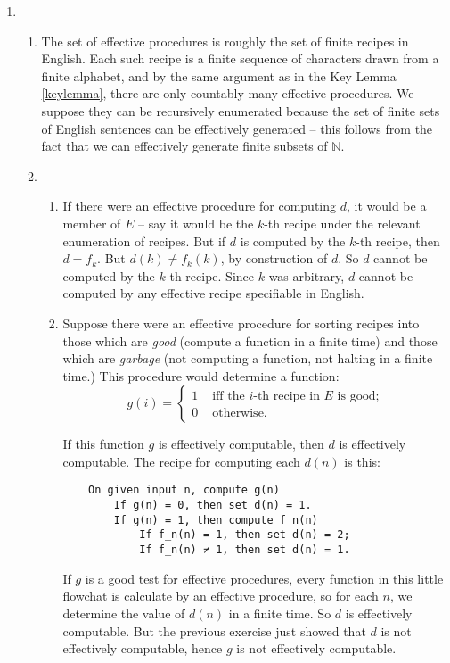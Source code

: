 {\begin{enumerate}
\begin{enumerate}
\begin{itemize}
		\item  $G\widetilde{D}$ contains elements only from $\widetilde{\Delta}$. Then every structure makes some member of $\Delta$ true whose negation is in $G\widetilde{D}$. Let $\Psi$ be the disjunction of negations of every sentence in $G\widetilde{D}$; this is a finite tautologous disjunction. Let $\Phi$ be an arbitrary finite conjunction of members from $\Gamma$. Since $\Psi$ is a tautology, $\Phi\vDash \Psi$.
	\end{itemize}
\end{enumerate}
\item \begin{enumerate}
	\item The set of effective procedures is roughly the set of finite recipes in English. Each such recipe is a finite sequence of characters drawn from a finite alphabet, and by the same argument as in the Key Lemma \ref{keylemma}, there are only countably many effective procedures. We suppose they can be recursively enumerated because the set of finite sets of English sentences can be effectively generated – this follows from the fact that we can effectively generate finite subsets of $\mathbb{N}$.
	\item \begin{enumerate}
		\item If there were an effective procedure for computing $d$, it would be a member of $E$ – say it would be the $k$-th recipe under the relevant enumeration of recipes. But if $d$ is computed by the $k$-th recipe, then $d=f_{k}$. But $d(k) ≠ f_{k}(k)$, by construction of $d$. So $d$ cannot be computed by the $k$-th recipe. Since $k$ was arbitrary, $d$ cannot be computed by any effective recipe specifiable in English.
		\item Suppose there were an effective procedure for sorting recipes into those which are \emph{good} (compute a function in a finite time) and those which are \emph{garbage} (not computing a function, not halting in a finite time.) This procedure would determine a function: $$g(i) = \begin{cases}
			1 &\text{ iff the $i$-th recipe in $E$ is good;}\\
			0 &\text{ otherwise}.
		\end{cases}$$

If this function $g$ is effectively computable, then $d$ is effectively computable. The recipe for computing each $d(n)$ is this: \begin{verbatim}
    On given input n, compute g(n) 
        If g(n) = 0, then set d(n) = 1. 
        If g(n) = 1, then compute f_n(n)
            If f_n(n) = 1, then set d(n) = 2;
            If f_n(n) ≠ 1, then set d(n) = 1.
\end{verbatim} 
If $g$ is a good test for effective procedures, every function in this little flowchat is calculate by an effective procedure, so for each $n$, we determine the value of $d(n)$ in a finite time. So $d$ is effectively computable. But the previous exercise just showed that $d$ is not effectively computable, hence $g$ is not effectively computable.


\end{enumerate}
\end{enumerate}
\end{enumerate}}
